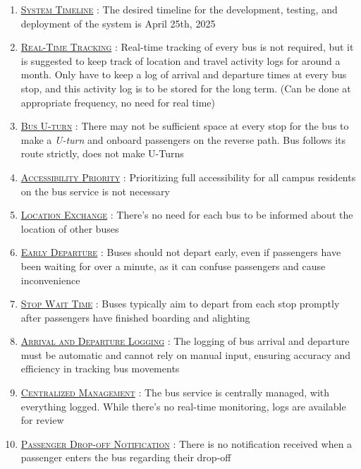 \begin{enumerate}
    \item \underline{\textsc{System Timeline}} : The desired timeline for the development, testing, and deployment of the system is April 25th, 2025

    \item {}\underline{\textsc{Real-Time Tracking}} : Real-time tracking of every bus is not required, but it is suggested to keep track of location and travel activity logs for around a month. Only have to keep a log of arrival and departure times at every bus stop, and this activity log is to be stored for the long term. (Can be done at appropriate frequency, no need for real time)

    \item {}\underline{\textsc{Bus \gls{U-turn}}} : There may not be sufficient space at every stop for the bus to make a \textit{\gls{U-turn}} and onboard passengers on the reverse path. Bus follows its route strictly, does not make U-Turns

    \item {}\underline{\textsc{Accessibility Priority}} : Prioritizing full accessibility for all campus residents on the bus service is not necessary

    \item \underline{\textsc{Location Exchange}} : There's no need for each bus to be informed about the location of other buses

    \item \underline{\textsc{Early Departure}} : Buses should not depart early, even if passengers have been waiting for over a minute, as it can confuse passengers and cause inconvenience

    \item \underline{\textsc{Stop Wait Time}} : Buses typically aim to depart from each stop promptly after passengers have finished boarding and alighting

    \item \underline{\textsc{Arrival and Departure Logging}} : The logging of bus arrival and departure must be automatic and cannot rely on manual input, ensuring accuracy and efficiency in tracking bus movements

    \item \underline{\textsc{Centralized Management}} : The bus service is centrally managed, with everything logged. While there's no real-time monitoring, logs are available for review

    \item \underline{\textsc{Passenger Drop-off Notification}} : There is no notification received when a passenger enters the bus regarding their drop-off


\end{enumerate}
